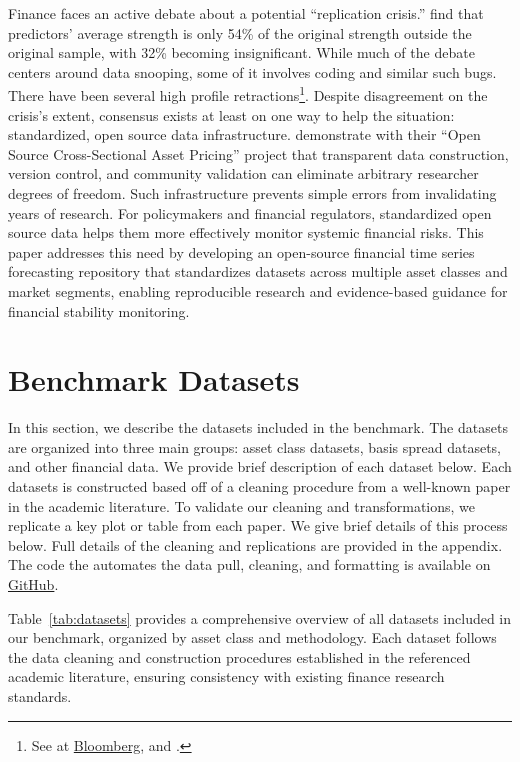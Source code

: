 \documentclass{article}
\begin{document}
Finance faces an active debate about a potential ``replication crisis.'' \cite{Jensen2023} find that predictors' average strength is only 54\% of the original strength outside the original sample, with 32\% becoming insignificant. While much of the debate centers around data snooping, some of it involves
coding and similar such bugs. There have been several high profile retractions\footnote{See  \cite{Lee2023} at \href{https://www.bloomberg.com/news/articles/2023-12-01/a-grad-school-number-cruncher-shakes-up-the-world-of-bond-quants}{Bloomberg}, and \cite{Dickerson2024}.}.
Despite disagreement on the crisis's extent, consensus exists at least on one way to help the situation: standardized, open source data infrastructure. \cite{Chen2022} demonstrate with their ``Open Source Cross-Sectional Asset Pricing'' project that transparent data construction, version control, and community validation can eliminate arbitrary researcher degrees of freedom. Such infrastructure prevents simple errors from invalidating years of research. For policymakers and financial regulators, standardized open source data 
helps them more effectively monitor systemic financial risks. This paper addresses this need by developing an open-source financial time series forecasting repository that standardizes datasets across multiple asset classes and market segments, enabling reproducible research and evidence-based guidance for financial stability monitoring.


\section{Benchmark Datasets}

In this section, we describe the datasets included in the benchmark. The datasets are organized into three main groups: asset class datasets, basis spread datasets, and other financial data. We provide brief description of each dataset below. Each datasets is constructed based off of a cleaning procedure from a well-known paper in the academic literature. To validate our cleaning and transformations, we replicate a key plot or table from each paper. We give brief details of this process below. Full details of the cleaning and replications are provided in the appendix.
The code the automates the data pull, cleaning, and formatting is available on \href{https://github.com/jmbejara/ftsfr}{GitHub}.

Table~\ref{tab:datasets} provides a comprehensive overview of all datasets included in our benchmark, organized by asset class and methodology. Each dataset follows the data cleaning and construction procedures established in the referenced academic literature, ensuring consistency with existing finance research standards.
\end{document}
